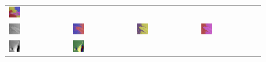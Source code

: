 \begin{figure}[h!]
\begin{tabular}{C{0.24\textwidth}C{0.24\textwidth}C{0.24\textwidth}C{0.24\textwidth}}
		\includegraphics[width=0.2\textwidth]{images/gen/pooling_layers/p03_02.png_4.png} \\
		\includegraphics[width=0.2\textwidth]{images/p03/p03_03.png} &
		\includegraphics[width=0.2\textwidth]{images/gen/pooling_layers/p03_03.png_1.png} &
		\includegraphics[width=0.2\textwidth]{images/gen/pooling_layers/p03_03.png_2.png} &
		\includegraphics[width=0.2\textwidth]{images/gen/pooling_layers/p03_03.png_4.png} \\
		\includegraphics[width=0.2\textwidth]{images/p03/p03_04.png} &
		\includegraphics[width=0.2\textwidth]{images/gen/pooling_layers/p03_04.png_1.png} &

\end{tabular}
\end{figure}
